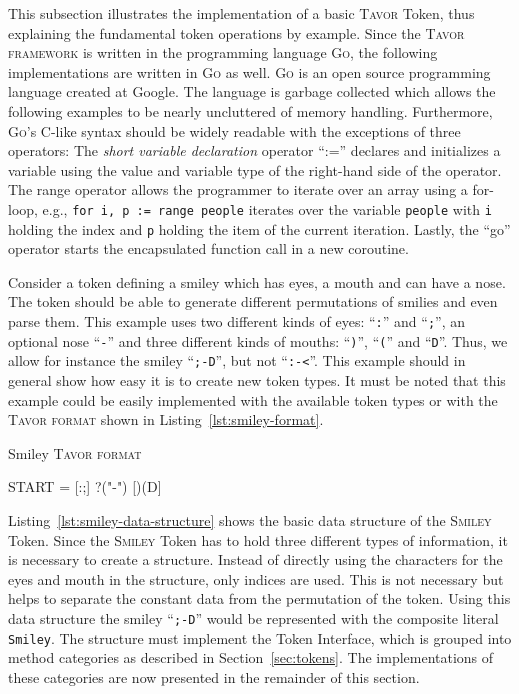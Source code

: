 This subsection illustrates the implementation of a basic \textsc{Tavor} Token, thus explaining the fundamental token operations by example. Since the \textsc{Tavor framework} is written in the programming language \textsc{Go}, the following implementations are written in \textsc{Go} as well. \textsc{Go} is an open source programming language created at Google. The language is garbage collected which allows the following examples to be nearly uncluttered of memory handling. Furthermore, \textsc{Go}'s C-like syntax should be widely readable with the exceptions of three operators: The \emph{short variable declaration} operator \enquote{:=} declares and initializes a variable using the value and variable type of the right-hand side of the operator. The range operator allows the programmer to iterate over an array using a for-loop, e.g., \texttt{for i, p := range people} iterates over the variable \texttt{people} with \texttt{i} holding the index and \texttt{p} holding the item of the current iteration. Lastly, the \enquote{go} operator starts the encapsulated function call in a new coroutine.

Consider a token defining a smiley which has eyes, a mouth and can have a nose. The token should be able to generate different permutations of smilies and even parse them. This example uses two different kinds of eyes: \enquote{\texttt{:}} and \enquote{\texttt{;}}, an optional nose \enquote{\texttt{-}} and three different kinds of mouths: \enquote{\texttt{)}}, \enquote{\texttt{(}} and \enquote{\texttt{D}}. Thus, we allow for instance the smiley \enquote{\texttt{;-D}}, but not \enquote{\texttt{:-<}}. This example should in general show how easy it is to create new token types. It must be noted that this example could be easily implemented with the available token types or with the \textsc{Tavor format} shown in Listing~\ref{lst:smiley-format}.

\begin{listing}
\caption{Smiley \textsc{Tavor format}}
\label{lst:smiley-format}
\begin{gocode}
START = [:;] ?("-") [)(D]
\end{gocode}
\end{listing}

Listing~\ref{lst:smiley-data-structure} shows the basic data structure of the \textsc{Smiley} Token. Since the \textsc{Smiley} Token has to hold three different types of information, it is necessary to create a structure. Instead of directly using the characters for the eyes and mouth in the structure, only indices are used. This is not necessary but helps to separate the constant data from the permutation of the token. Using this data structure the smiley \enquote{\texttt{;-D}} would be represented with the composite literal \texttt{Smiley}. The structure must implement the Token Interface, which is grouped into method categories as described in Section~\ref{sec:tokens}. The implementations of these categories are now presented in the remainder of this section.

